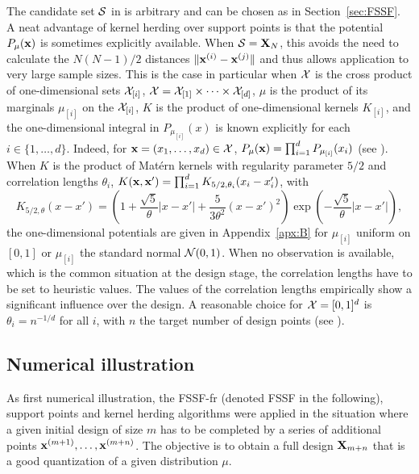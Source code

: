 The candidate set $\mathcal{S}$ in  is arbitrary and can be chosen as in Section~\ref{sec:FSSF}. 
A neat advantage of kernel herding over support points is that the potential $P_{\mu}({\bf x})$ is sometimes explicitly available. 
When $\mathcal{S}={\bf X}_N$, this avoids the need to calculate the $N(N-1)/2$ distances $\|{\bf x}^{(i)}-{\bf x}^{(j)}\|$ and thus allows application to very large sample sizes. 
This is the case in particular when $\mathcal{X}$ is the cross product of one-dimensional sets $\mathcal{X}_{[i]}$, $\mathcal{X}=\mathcal{X}_{[1]}\times\cdots\times\mathcal{X}_{[d]}$, $\mu$ is the product of 
its marginals
$\mu_{[i]}$ on the $\mathcal{X}_{[i]}$, $K$ is the product of one-dimensional kernels $K_{[i]}$, and the one-dimensional integral in $P_{\mu_{[i]}}(x)$ is known explicitly for each $i\in\{1,\ldots,d\}$. 
Indeed, for ${\bf x}=(x_1,\ldots,x_d)\in\mathcal{X}$, $P_{\mu}({\bf x})=\prod_{i=1}^d P_{\mu_{[i]}}(x_i)$ (see \citealp{pronzato_zhigljavsky_2020}). 
When $K$ is the product of Mat\'ern kernels with regularity parameter $5/2$ and correlation lengths $\theta_i$, $K({\bf x},{\bf x}') = \prod_{i=1}^{d} K_{5/2,\theta_{i}}(x_{i}-x'_i)$, with
\begin{equation}\label{eq:Matern5/2}
K_{5/2,\theta}(x-x')
=
\left(1 + \frac{\sqrt{5}}{\theta} |x - x'| + \frac{5}{3 \theta^2} (x - x')^2 \right)
\exp \left( - \frac{\sqrt{5}}{\theta} |x - x'| \right),
\end{equation}
the one-dimensional potentials are given in Appendix~\ref{apx:B} for $\mu_{[i]}$ uniform on $[0,1]$ or $\mu_{[i]}$ the standard normal ${\mathcal{N}}(0,1)$. 
When no observation is available, which is the common situation at the design stage, the correlation lengths have to be set to heuristic values. 
The values of the correlation lengths empirically show a significant influence over the design. 
A reasonable choice for $\mathcal{X}=[0,1]^d$ is $\theta_i = n^{-1/d}$ for all $i$, with $n$ the target number of design points (see \citealp{pronzato_zhigljavsky_2020}). 

\subsection{Numerical illustration}\label{sec:numerical-1}

As first numerical illustration, the FSSF-fr (denoted FSSF in the following), support points and kernel herding algorithms were applied in the situation where a given initial design of size $m$ has to be completed by a series of additional points ${\bf x}^{(m+1)},\ldots,{\bf x}^{(m+n)}$. 
The objective is to obtain a full design ${\bf X}_{m+n}$ that is a good quantization of a given distribution $\mu$. 

